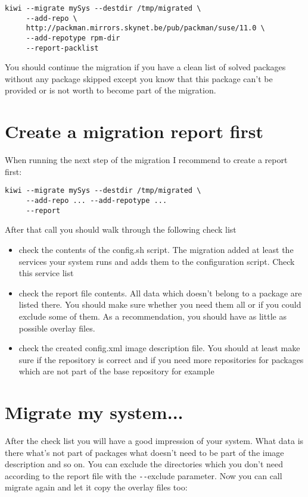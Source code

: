 \begin{Command}{16cm}
\begin{verbatim}
kiwi --migrate mySys --destdir /tmp/migrated \
     --add-repo \
     http://packman.mirrors.skynet.be/pub/packman/suse/11.0 \
     --add-repotype rpm-dir
     --report-packlist
\end{verbatim}
\end{Command}

You should continue the migration if you have a clean list of solved
packages without any package skipped except you know that this package
can't be provided or is not worth to become part of the migration.

\section{Create a migration report first}
When running the next step of the migration I
recommend to create a report first:

\begin{Command}{12cm}
\begin{verbatim}
kiwi --migrate mySys --destdir /tmp/migrated \
     --add-repo ... --add-repotype ...
     --report
\end{verbatim}
\end{Command}

After that call you should walk through the following check list

\begin{itemize}
\item check the contents of the config.sh script. The migration
      added at least the services your system runs and adds them
      to the configuration script. Check this service list
\item check the report file contents. All data which doesn't belong
      to a package are listed there. You should make sure whether you
      need them all or if you could exclude some of them. As a
      recommendation, you should have as little as possible overlay
      files.
\item check the created config.xml image description file. You should
      at least make sure if the repository is correct and if you need
      more repositories for packages which are not part of the base
      repository for example
\end{itemize}

\section{Migrate my system...}
After the check list you will have a good impression of your system.
What data is there what's not part of packages what doesn't need to
be part of the image description and so on. You can exclude the
directories which you don't need according to the report file with
the \verb+--+exclude parameter. Now you can call migrate again and let
it copy the overlay files too:


